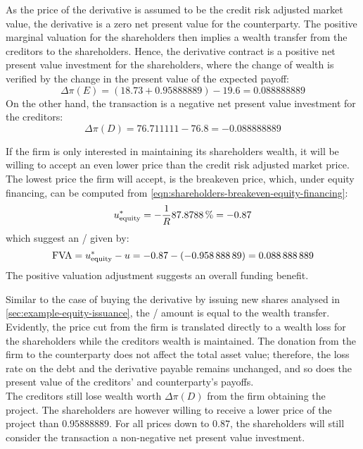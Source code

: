 \documentclass[../main.tex]{subfiles}
\begin{document}
            As the price of the derivative is assumed to be the credit risk adjusted market value,
            the derivative is a zero net present value for the counterparty.
            The positive marginal valuation for the shareholders then implies a wealth transfer from the creditors to the shareholders.
            Hence, the derivative contract is a positive net present value investment for the shareholders, 
            where the change of wealth is verified by the change in the present value of the expected payoff:
            \begin{equation}
                \Delta \pi(E) = (\num{18.73} + \num{0.95888889}) - \num{19.6} = \num{0.088888889}
            \end{equation}
            On the other hand, the transaction is a negative net present value investment for the creditors:
            \begin{equation}
                \Delta \pi(D) = \num{76.711111} - \num{76.8} = \num{-0.088888889}
            \end{equation}

            If the firm is only interested in maintaining its shareholders wealth,
            it will be willing to accept an even lower price than the credit risk adjusted market price.
            The lowest price the firm will accept, is the breakeven price,
            which, under equity financing, can be computed from 
            \cref{eqn:shareholders-breakeven-equity-financing}:
            \begin{equation}
                u_{\text{equity}}^{\ast} =
                - \discountfactor
                \pct{0.878788}
                = \num{-0.87}
            \end{equation}
            which suggest an \FVA/ given by:
            \begin{equation}
                \FVA/ =
                u_{\text{equity}}^{\ast} - u =
                \num{-0.87} - \left(\num{-0.95888889}\right) =
                \num{0.088888889}
            \end{equation}
            The positive valuation adjustment suggests an overall funding benefit.
            
            Similar to the case of buying the derivative by issuing new shares analysed in \cref{sec:example-equity-issuance},
            the \FVA/ amount is equal to the wealth transfer.
            Evidently, the price cut from the firm is translated directly to a wealth loss
            for the shareholders while the creditors wealth is maintained. 
            The donation from the firm to the counterparty does not affect the total asset value;
            therefore, the loss rate on the debt and the derivative payable remains unchanged,
            and so does the present value of the creditors' and counterparty's payoffs.
            \\
            The creditors still lose wealth worth $\Delta \pi(D)$ from the firm obtaining the project.
            The shareholders are however willing to receive a lower price of the project than $\num{0.95888889}$.
            For all prices down to $\num{0.87}$,
            the shareholders will still consider the transaction a non-negative net present value investment.
\end{document}
